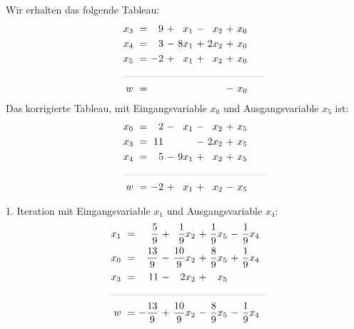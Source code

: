 \documentclass [a4paper,11pt]{article}
\begin{document}
\begin{enumerate}
\begin{enumerate}
            \newpage

            Wir erhalten das folgende Tableau:
            \begin{align*}
            \begin{alignedat}{6}
            && x_3 &\ = &\  9 &\ + &\  x_1 &\ - &\  x_2 &\ + &\ x_0 \\
            && x_4 &\ = &\  3 &\ - &\ 8x_1 &\ + &\ 2x_2 &\ + &\ x_0 \\
            && x_5 &\ = &\ -2 &\ + &\  x_1 &\ + &\  x_2 &\ + &\ x_0 \\
            &\rlap{\rule{5cm}{.1pt}} &&&&&&&&&\\
            && w   &\ = &     &    &       &    &       &\ - &\ x_0
            \end{alignedat}
            \end{align*}
            Das korrigierte Tableau, mit Eingangsvariable $x_0$ und Ausgangsvariable $x_5$ ist:
            \begin{align*}
            \begin{alignedat}{6}
            && x_0 &\ = &\  2 &\ - &\  x_1 &\ - &\  x_2 &\ + &\ x_5 \\
            && x_3 &\ = &\ 11 &    &       &\ - &\ 2x_2 &\ + &\ x_5 \\
            && x_4 &\ = &\  5 &\ - &\ 9x_1 &\ + &\  x_2 &\ + &\ x_5 \\
            &\rlap{\rule{5cm}{.1pt}} &&&&&&&&&\\
            && w   &\ = &\ -2 &\ + &\  x_1 &\ + &\  x_2 &\ - &\ x_5
            \end{alignedat}
            \end{align*}

            1. Iteration mit Eingangsvariable $x_1$ und Ausgangsvariable $x_4$:
            \begin{align*}
            \begin{alignedat}{6}
            && x_1 &\ = &\   \frac{5}{9} &\ + &\  \frac{1}{9}x_2 &\ + &\ \frac{1}{9}x_5 &\ - &\ \frac{1}{9}x_4 \\
            && x_0 &\ = &\  \frac{13}{9} &\ - &\ \frac{10}{9}x_2 &\ + &\ \frac{8}{9}x_5 &\ + &\ \frac{1}{9}x_4 \\
            && x_3 &\ = &\            11 &\ - &\            2x_2 &\ + &\            x_5 &    & \\
            &\rlap{\rule{5.5cm}{.1pt}} &&&&&&&&&\\
            && w   &\ = &\ -\frac{13}{9} &\ + &\ \frac{10}{9}x_2 &\ - &\ \frac{8}{9}x_5 &\ - &\ \frac{1}{9}x_4
            \end{alignedat}
            \end{align*}


\end{enumerate}
\end{enumerate}
\end{document}
